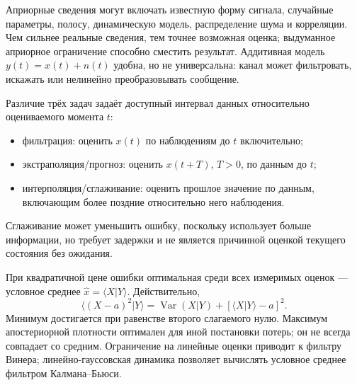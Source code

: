 
Априорные сведения могут включать известную форму сигнала, случайные параметры, полосу, динамическую модель, распределение шума и корреляции. Чем сильнее реальные сведения, тем точнее возможная оценка; выдуманное априорное ограничение способно сместить результат. Аддитивная модель $y(t)=x(t)+n(t)$ удобна, но не универсальна: канал может фильтровать, искажать или нелинейно преобразовывать сообщение.

Различие трёх задач задаёт доступный интервал данных относительно оцениваемого момента $t$:
\begin{itemize}
\item фильтрация: оценить $x(t)$ по наблюдениям до $t$ включительно;
\item экстраполяция/прогноз: оценить $x(t+T)$, $T>0$, по данным до $t$;
\item интерполяция/сглаживание: оценить прошлое значение по данным, включающим более поздние относительно него наблюдения.
\end{itemize}
Сглаживание может уменьшить ошибку, поскольку использует больше информации, но требует задержки и не является причинной оценкой текущего состояния без ожидания.

При квадратичной цене ошибки оптимальная среди всех измеримых оценок — условное среднее $\hat x=\langle X|Y\rangle$. Действительно,
\begin{equation}
 \langle(X-a)^2|Y\rangle=\operatorname{Var}(X|Y)+[\langle X|Y\rangle-a]^2.
\end{equation}
Минимум достигается при равенстве второго слагаемого нулю. Максимум апостериорной плотности оптимален для иной постановки потерь; он не всегда совпадает со средним. Ограничение на линейные оценки приводит к фильтру Винера; линейно-гауссовская динамика позволяет вычислять условное среднее фильтром Калмана–Бьюси.
